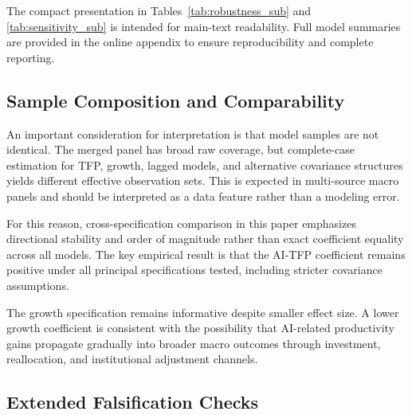 The compact presentation in Tables~\ref{tab:robustness_sub} and \ref{tab:sensitivity_sub} is intended for main-text readability. Full model summaries are provided in the online appendix to ensure reproducibility and complete reporting.

\subsection{Sample Composition and Comparability}

An important consideration for interpretation is that model samples are not identical. The merged panel has broad raw coverage, but complete-case estimation for TFP, growth, lagged models, and alternative covariance structures yields different effective observation sets. This is expected in multi-source macro panels and should be interpreted as a data feature rather than a modeling error.

For this reason, cross-specification comparison in this paper emphasizes directional stability and order of magnitude rather than exact coefficient equality across all models. The key empirical result is that the AI-TFP coefficient remains positive under all principal specifications tested, including stricter covariance assumptions.

The growth specification remains informative despite smaller effect size. A lower growth coefficient is consistent with the possibility that AI-related productivity gains propagate gradually into broader macro outcomes through investment, reallocation, and institutional adjustment channels.

\subsection{Extended Falsification Checks}



\begin{table}[H]
\centering
\caption{Extended Falsification Checks}
\label{tab:falsification}

\end{table}

\begin{table}[H]
\centering
\caption{Country-Years With vs. Without AI Data: Observable Characteristics}
\label{tab:sample-selection}

\end{table}


